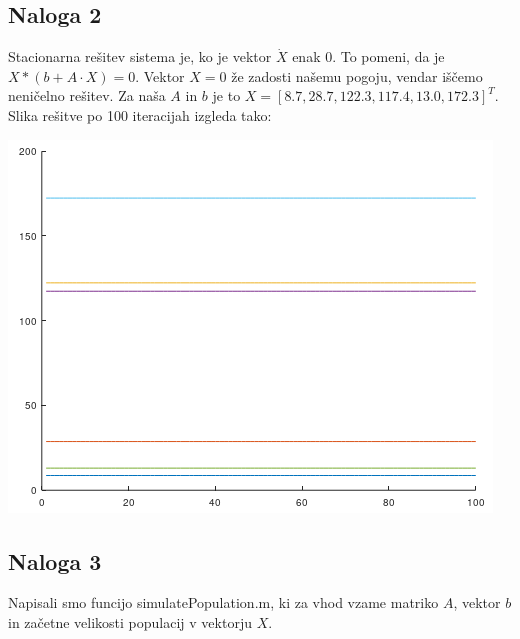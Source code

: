 \documentclass[a4paper, 12pt]{article}
\begin{document}
\subsection{Naloga 2}
Stacionarna rešitev sistema je, ko je vektor $ \dot X $ enak  $ 0 $. To pomeni, da je
$ X*(b+A\cdot X) = 0 $. Vektor $ X = 0 $ že zadosti našemu pogoju, vendar iščemo neničelno
rešitev. Za naša $ A $ in $ b $ je to $ X = \left[8.7, 28.7, 122.3, 117.4, 13.0, 172.3\right]^{T} $.
Slika rešitve po 100 iteracijah izgleda tako:\\
\begin{center}
	\includegraphics{stationary.png}
\end{center}

\subsection{Naloga 3}
Napisali smo funcijo {\sf simulatePopulation.m}, ki za vhod vzame matriko $ A $, vektor $ b $ in začetne
velikosti populacij v vektorju $ X $.
\end{document}
